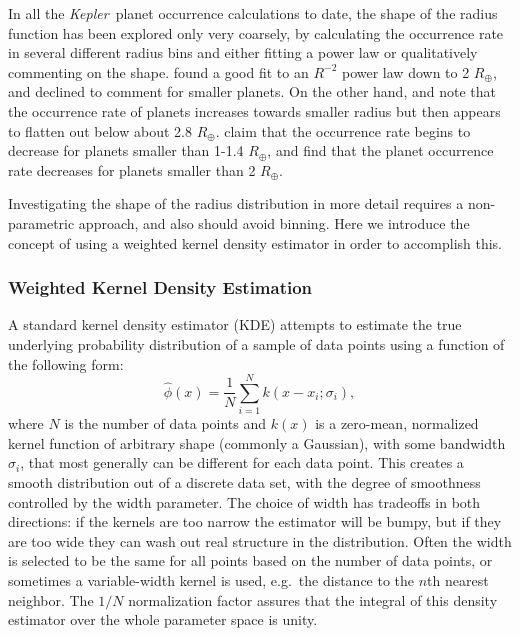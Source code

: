 \documentclass[iop]{emulateapj}
\def\Kepler{\textit{Kepler}}
\def\Rearth{R_\oplus}
\begin{document}
In all the \Kepler\ planet occurrence calculations to date, the shape of the radius function has been explored only very coarsely, by calculating the occurrence rate in several different radius bins and either fitting a power law or qualitatively commenting on the shape.  \citet{howard2012} found a good fit to an $R^{-2}$ power law down to 2 $\Rearth$, and declined to comment for smaller planets.  On the other hand, \citet{fressin2013} and \citet{petigura2013} note that the occurrence rate of planets increases towards smaller radius but then appears to flatten out below about 2.8 $\Rearth$.  \citet{dressing2013} claim that the occurrence rate begins to decrease for planets  smaller than 1-1.4 $\Rearth$, and \citet{petigura2013b} find that the planet occurrence rate decreases for planets smaller than 2 $\Rearth$. 

Investigating the shape of the radius distribution in more detail requires a non-parametric approach, and also should avoid binning.  Here we introduce the concept of using a weighted kernel density estimator in order to accomplish this.

\subsubsection{Weighted Kernel Density Estimation}
\label{sec:wkde}

A standard kernel density estimator (KDE) attempts to estimate the true underlying probability distribution of a sample of data points using a function of the following form:
\begin{equation}
\label{eq:kde}
\hat\phi(x) = \frac{1}{N} \sum_{i=1}^N k(x-x_i;\sigma_i),
\end{equation}
where $N$ is the number of data points and $k(x)$ is a zero-mean, normalized kernel function of arbitrary shape (commonly a Gaussian), with some bandwidth $\sigma_i$, that most generally can be different for each data point.  This creates a smooth distribution out of a discrete data set, with the degree of smoothness controlled by the width parameter.  The choice of width has tradeoffs in both directions: if the kernels are too narrow the estimator will be bumpy, but if they are too wide they can wash out real structure in the distribution.  Often the width is selected to be the same for all points based on the number of data points, or sometimes a variable-width kernel is used, e.g.~the distance to the $n$th nearest neighbor.  The $1/N$ normalization factor assures that the integral of this density estimator over the whole parameter space is unity. 
\end{document}
